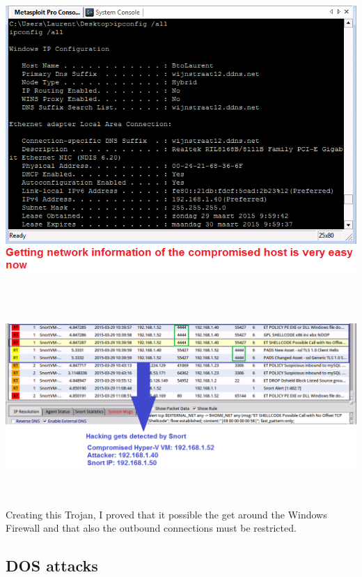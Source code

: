 \documentclass[11pt, a4paper]{article}
\begin{document}
$\;$ \\ \\
\noindent\begin{minipage}{\textwidth}
    \centering
    \includegraphics[width=\textwidth]{Trojan_7.png}
\end{minipage}
$\;$ \\ \\
\noindent\begin{minipage}{\textwidth}
    \centering
    \includegraphics[width=\textwidth]{Trojan_6.png}
\end{minipage}
$\;$ \\ \\
Creating this Trojan, I proved that it possible the get around the Windows Firewall and that also the outbound connections must be restricted.

\subsection*{DOS attacks}
\end{document}
